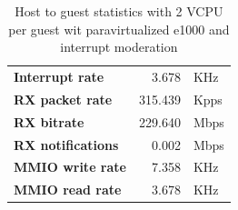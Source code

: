 \begin{table}
\begin{center}
\begin{tabular}{lrl}
\toprule
\textbf{Interrupt rate} & 3.678 & KHz\\
\textbf{RX packet rate} & 315.439 & Kpps\\
\textbf{RX bitrate} & 229.640 & Mbps\\
\textbf{RX notifications} & 0.002 & Mbps\\
\textbf{MMIO write rate} & 7.358 & KHz\\
\textbf{MMIO read rate} & 3.678 & KHz\\
\bottomrule
\end{tabular}
\end{center}
\caption{Host to guest statistics with 2 VCPU per guest wit paravirtualized e1000 and interrupt moderation}
\label{tab:e1000-par-rx-g2h2vcpu}
\end{table}

